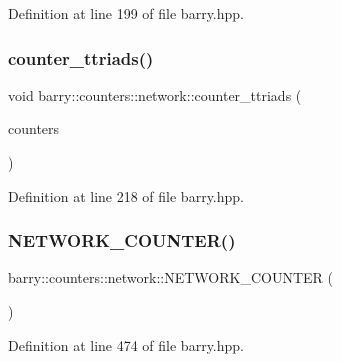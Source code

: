 Definition at line 199 of file barry.\+hpp.

\mbox{\label{namespacebarry_1_1counters_1_1network_ab3a9cd11d47c9c1d5652c28d139047c8}} 
\subsubsection{\texorpdfstring{counter\+\_\+ttriads()}{counter\_ttriads()}}
{\footnotesize\ttfamily void barry\+::counters\+::network\+::counter\+\_\+ttriads (\begin{DoxyParamCaption}\item[{\hyperlink{namespacebarry_1_1counters_1_1network_a3b3c590303d47840d1967372ae495d95}{Net\+Counter\+Vector} $\ast$}]{counters }\end{DoxyParamCaption})\hspace{0.3cm}{\ttfamily [inline]}}



Definition at line 218 of file barry.\+hpp.

\mbox{\label{namespacebarry_1_1counters_1_1network_a7649cd035af193258a69058aea425941}} 
\subsubsection{\texorpdfstring{N\+E\+T\+W\+O\+R\+K\+\_\+\+C\+O\+U\+N\+T\+E\+R()}{NETWORK\_COUNTER()}}
{\footnotesize\ttfamily barry\+::counters\+::network\+::\+N\+E\+T\+W\+O\+R\+K\+\_\+\+C\+O\+U\+N\+T\+ER (\begin{DoxyParamCaption}\item[{init\+\_\+single\+\_\+attr}]{ }\end{DoxyParamCaption})}



Definition at line 474 of file barry.\+hpp.

